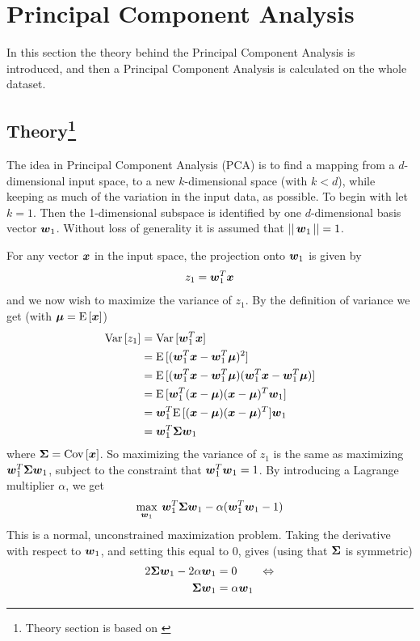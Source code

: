 \section{Principal Component Analysis}
In this section the theory behind the Principal Component Analysis is introduced, and then a Principal Component Analysis is calculated on the whole dataset.

\subsection[Theory]{Theory\protect\footnote{Theory section is based on \citet[p.113]{alpaydin10}}}
The idea in Principal Component Analysis (PCA) is to find a mapping from a $d$-dimensional input space, to a new $k$-dimensional space (with $k<d$), while keeping as much of the variation in the input data, as possible. To begin with let $k=1$. Then the 1-dimensional subspace is identified by one $d$-dimensional basis vector $\boldsymbol{w}_1$. Without loss of generality it is assumed that $||\,\boldsymbol{w}_1\,||=1$. \par
For any vector $\boldsymbol{x}$ in the input space, the projection onto $\boldsymbol{w}_1$ is given by
\[
    z_1 = \boldsymbol{w}_1^T \boldsymbol{x}
\]
and we now wish to maximize the variance of $z_1$. By the definition of variance we get (with $\boldsymbol{\mu}=\text{E}\,[\boldsymbol{x}]$)
\begin{align*}
    \text{Var}\,[z_1] &= \text{Var}\,[\boldsymbol{w}_1^T\boldsymbol{x}] \\
    &= \text{E}\,[(\boldsymbol{w}_1^T\boldsymbol{x} - \boldsymbol{w}_1^T\boldsymbol{\mu})^2] \\
    &= \text{E}\,[(\boldsymbol{w}_1^T\boldsymbol{x} - \boldsymbol{w}_1^T\boldsymbol{\mu})(\boldsymbol{w}_1^T\boldsymbol{x} - \boldsymbol{w}_1^T\boldsymbol{\mu})] \\
    &= \text{E}\,[\boldsymbol{w}_1^T(\boldsymbol{x}-\boldsymbol{\mu})(\boldsymbol{x}-\boldsymbol{\mu})^T\boldsymbol{w}_1] \\
    &= \boldsymbol{w}_1^T\text{E}\,[(\boldsymbol{x}-\boldsymbol{\mu})(\boldsymbol{x}-\boldsymbol{\mu})^T]\boldsymbol{w}_1 \\
    &= \boldsymbol{w}_1^T\boldsymbol{\Sigma}\boldsymbol{w}_1
\end{align*}
where $\boldsymbol{\Sigma} = \text{Cov}\,[\boldsymbol{x}]$. So maximizing the variance of $z_1$ is the same as maximizing $\boldsymbol{w}_1^T\boldsymbol{\Sigma}\boldsymbol{w}_1$, subject to the constraint that $\boldsymbol{w}_1^T\boldsymbol{w}_1=1$. By introducing a Lagrange multiplier $\alpha$, we get
\[
    \max_{\boldsymbol{w}_1}\:\boldsymbol{w}_1^T\boldsymbol{\Sigma}\boldsymbol{w}_1 - \alpha(\boldsymbol{w}_1^T\boldsymbol{w}_1 - 1)
\]
This is a normal, unconstrained maximization problem. Taking the derivative with respect to $\boldsymbol{w}_1$, and setting this equal to 0, gives (using that $\boldsymbol{\Sigma}$ is symmetric)
\begin{align*}
    2\boldsymbol{\Sigma}\boldsymbol{w}_1 - 2\alpha\boldsymbol{w}_1 &= 0 \quad\quad\Leftrightarrow \\
    \boldsymbol{\Sigma}\boldsymbol{w}_1 &= \alpha\boldsymbol{w}_1
\end{align*}
